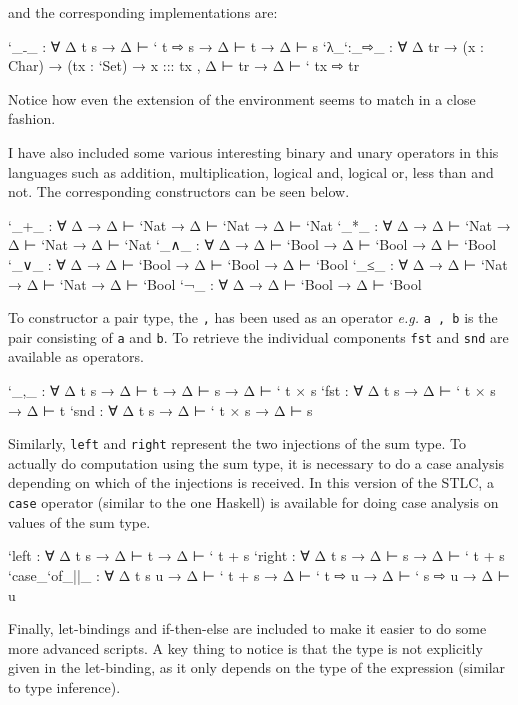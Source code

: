 \documentclass{article}
\begin{document}
and the corresponding implementations are:
\begin{code}
    `_₋_             : ∀ {Δ t s} → Δ ⊢ ` t ⇨ s → Δ ⊢ t → Δ ⊢ s
    `λ_`:_⇨_       : ∀ {Δ tr} → (x : Char) → (tx : `Set) 
                       → x ::: tx , Δ ⊢ tr → Δ ⊢ ` tx ⇨ tr
\end{code}
Notice how even the extension of the environment seems to match in a close fashion.

I have also included some various interesting binary and unary operators in this languages such as addition, multiplication,
logical and, logical or, less than and not. The corresponding constructors can be seen below.

\begin{code}
    `_+_             : ∀ {Δ} → Δ ⊢ `Nat → Δ ⊢ `Nat → Δ ⊢ `Nat
    `_*_             : ∀ {Δ} → Δ ⊢ `Nat →  Δ ⊢ `Nat → Δ ⊢ `Nat
    `_∧_             : ∀ {Δ} → Δ ⊢ `Bool → Δ ⊢ `Bool → Δ ⊢ `Bool
    `_∨_             : ∀ {Δ} → Δ ⊢ `Bool →  Δ ⊢ `Bool → Δ ⊢ `Bool
    `_≤_             : ∀ {Δ} → Δ ⊢ `Nat → Δ ⊢ `Nat →  Δ ⊢ `Bool
    `¬_              : ∀ {Δ} → Δ ⊢ `Bool →  Δ ⊢ `Bool 
\end{code}

To constructor a pair type, the \texttt{,} has been used as an operator \textit{e.g.} \texttt{a , b} is the pair consisting
of \texttt{a} and \texttt{b}. To retrieve the individual components \texttt{fst} and \texttt{snd} are available as operators.

\begin{code}
    `_,_             : ∀ {Δ t s} → Δ ⊢ t →  Δ ⊢ s →  Δ ⊢ ` t × s
    `fst             : ∀ {Δ t s} → Δ ⊢ ` t × s → Δ ⊢ t
    `snd             : ∀ {Δ t s} → Δ ⊢ ` t × s → Δ ⊢ s
\end{code}

Similarly, \texttt{left} and \texttt{right} represent the two injections of the sum type. To actually do computation using
the sum type, it is necessary to do a case analysis depending on which of the injections is received.
In this version of the STLC, a \texttt{case} operator (similar to the one Haskell) is available for doing case analysis on values
of the sum type.

\begin{code}
    `left            : ∀ {Δ t s} → Δ ⊢ t → Δ ⊢ ` t + s
    `right           : ∀ {Δ t s} → Δ ⊢ s → Δ ⊢ ` t + s
    `case_`of_||_    : ∀ {Δ t s u} → Δ ⊢ ` t + s 
                          → Δ ⊢ ` t ⇨ u → Δ ⊢ ` s ⇨ u → Δ ⊢ u
\end{code}
Finally, let-bindings and if-then-else are included to make it easier to do some more advanced scripts.
A key thing to notice is that the type is not explicitly given in the let-binding, as it only depends on the type of the expression (similar to type inference).
\end{document}
